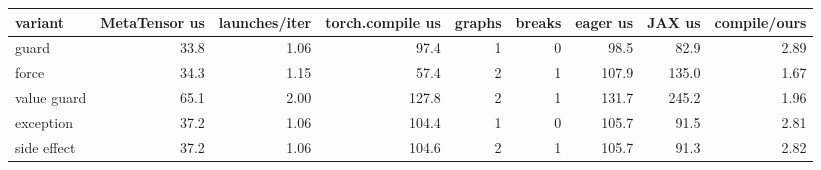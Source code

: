 \begin{tabular}{lrrrrrrrr}
\toprule
variant & MetaTensor us & launches/iter & torch.compile us & graphs & breaks & eager us & JAX us & compile/ours \\
\midrule
guard & 33.8 & 1.06 & 97.4 & 1 & 0 & 98.5 & 82.9 & 2.89 \\
force & 34.3 & 1.15 & 57.4 & 2 & 1 & 107.9 & 135.0 & 1.67 \\
value guard & 65.1 & 2.00 & 127.8 & 2 & 1 & 131.7 & 245.2 & 1.96 \\
exception & 37.2 & 1.06 & 104.4 & 1 & 0 & 105.7 & 91.5 & 2.81 \\
side effect & 37.2 & 1.06 & 104.6 & 2 & 1 & 105.7 & 91.3 & 2.82 \\
\bottomrule
\end{tabular}
